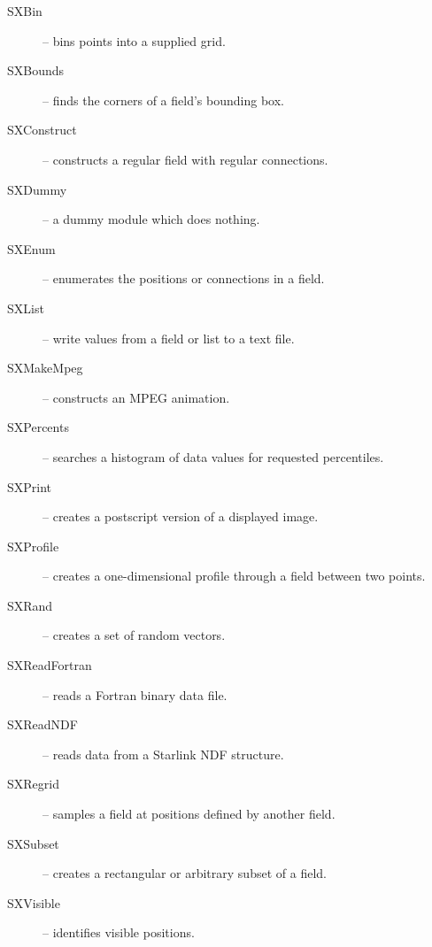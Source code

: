 \begin{description}

  \item[SXBin] -- bins points into a supplied grid.

  \item[SXBounds] -- finds the corners of a field's bounding box.

  \item[SXConstruct] -- constructs a regular field with regular
   connections.

  \item[SXDummy] -- a dummy module which does nothing.

  \item[SXEnum] -- enumerates the positions or connections in a field.

  \item[SXList] -- write values from a field or list to a text file.

  \item[SXMakeMpeg] -- constructs an MPEG animation.

  \item[SXPercents] -- searches a histogram of data values for requested
   percentiles.

  \item[SXPrint] -- creates a postscript version of a displayed image.

  \item[SXProfile] -- creates a one-dimensional profile through a field
   between two points.

  \item[SXRand] -- creates a set of random vectors.

  \item[SXReadFortran] -- reads a Fortran binary data file.

  \item[SXReadNDF] -- reads data from a Starlink NDF structure.

  \item[SXRegrid] -- samples a field at positions defined by another
   field.

  \item[SXSubset] -- creates a rectangular or arbitrary subset of a field.

  \item[SXVisible] -- identifies visible positions.


\end{description}

